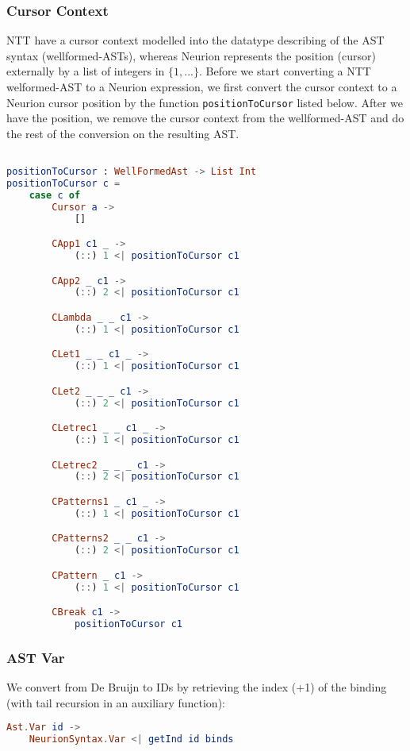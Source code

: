 \documentclass[10pt,a4paper,english]{article}
\begin{document}
\subsubsection*{Cursor Context}
NTT have a cursor context modelled into the datatype describing of the AST syntax (wellformed-ASTs), whereas Neurion represents the position (cursor) externally by a list of integers in $\{1,...\}$. 
Before we start converting a NTT welformed-AST to a Neurion expression, we first convert the cursor context to a Neurion cursor position by the function \texttt{positionToCursor} listed below. After we have the position, we remove the cursor context from the wellformed-AST and do the rest of the conversion on the resulting AST.
\begin{lstlisting}[language=elm,%
                     label="eval-evaluated",%
                     gobble=0,%
                     ]

positionToCursor : WellFormedAst -> List Int
positionToCursor c =
    case c of
        Cursor a ->
            []

        CApp1 c1 _ ->
            (::) 1 <| positionToCursor c1

        CApp2 _ c1 ->
            (::) 2 <| positionToCursor c1

        CLambda _ _ c1 ->
            (::) 1 <| positionToCursor c1

        CLet1 _ _ c1 _ ->
            (::) 1 <| positionToCursor c1

        CLet2 _ _ _ c1 ->
            (::) 2 <| positionToCursor c1

        CLetrec1 _ _ c1 _ ->
            (::) 1 <| positionToCursor c1

        CLetrec2 _ _ _ c1 ->
            (::) 2 <| positionToCursor c1

        CPatterns1 _ c1 _ ->
            (::) 1 <| positionToCursor c1

        CPatterns2 _ _ c1 ->
            (::) 2 <| positionToCursor c1

        CPattern _ c1 ->
            (::) 1 <| positionToCursor c1

        CBreak c1 ->
            positionToCursor c1
\end{lstlisting}

\subsubsection*{AST Var}
We convert from De Bruijn to IDs by retrieving the index (+1) of the binding (with tail recursion in an auxiliary function):
\begin{lstlisting}[language=elm,%
                     label="eval-evaluated",%
                     gobble=0,%
                     ]
Ast.Var id ->
    NeurionSyntax.Var <| getInd id binds
\end{lstlisting}
\end{document}
